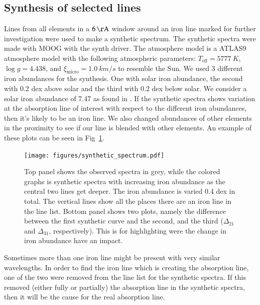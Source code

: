 \documentclass{aa}
\begin{document}
\subsection{Synthesis of selected lines}
\label{sub:synthesis_of_selected_lines}

Lines from all elements in a $\SI{6}{\AA}$ window around an iron line
marked for further investigation were used to make a synthetic spectrum.
The synthetic spectra were made with MOOG with the synth driver. The
atmosphere model is a ATLAS9 atmosphere model \citep{Kurucz1993} with
the following atmospheric parameters: $T_\mathrm{eff}=\SI{5777}{K}$,
$\log g = 4.438$, and $\xi_\mathrm{micro} = \SI{1.0}{km/s}$ to resemble
the Sun. We used 3 different iron abundances for the synthesis. One
with solar iron abundance, the second with 0.2 dex above solar and the
third with 0.2 dex below solar. We consider a solar iron abundance
of 7.47 as found in \cite{Gonzalez2000}. If the synthetic spectra
shows variation at the absorption line of interest with respect to the
different iron abundances, then it's likely to be an iron line. We also
changed abundances of other elements in the proximity to see if our line
is blended with other elements. An example of these plots can be seen in
Fig~\ref{fig:synthesis}.

\begin{figure}[tpb]
    \centering
    \texttt{[image: figures/synthetic\_spectrum.pdf]}
    \caption{Top panel shows the observed spectra in grey, while
        the colored graphs is synthetic spectra with increasing iron
        abundance as the central two lines get deeper. The iron abundance
        is varied 0.4 dex in total. The vertical lines show all the places
        there are an iron line in the line list. Bottom panel shows
        two plots, namely the difference between the first synthetic curve
        and the second, and the third ($\Delta_{21}$ and $\Delta_{31}$,
        respectively). This is for highlighting were the change in iron
        abundance have an impact.}
    \label{fig:synthesis}
\end{figure}


Sometimes more than one iron line might be present with very similar
wavelengths. In order to find the iron line which is creating the
absorption line, one of the two were removed from the line list for
the synthetic spectra. If this removed (either fully or partially) the
absorption line in the synthetic spectra, then it will be the cause for
the real absorption line.
\end{document}

